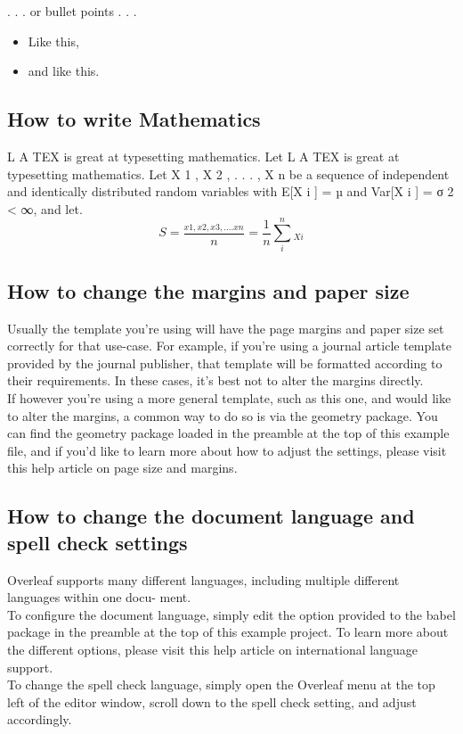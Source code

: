 \documentclass{article}
\begin{document}
\begin{flushleft}
\begin{enumerate}
			
		\end{enumerate}
				. . . or bullet points . . .
	 \begin{itemize}
		\item Like this,
		\item and like this.
	\end{itemize}
\subsection{How to write Mathematics}
L A TEX is great at typesetting mathematics. Let 
L A TEX is great at typesetting mathematics. Let X 1 , X 2 , . . . , X n be a sequence of independent and identically distributed random variables with E[X i ] = µ and Var[X i ] = σ 2 < ∞, and let.
\begin{equation}
S=\frac{_{x1,x2,x3,....xn}}{n}=\frac{1}{n}\sum_{i}^{n}_{Xi}

\end{equation}
\subsection{How to change the margins and paper size}
Usually the template you’re using will have the page margins and paper size set correctly for that
use-case. For example, if you’re using a journal article template provided by the journal publisher,
that template will be formatted according to their requirements. In these cases, it’s best not to alter
the margins directly.\\
If however you’re using a more general template, such as this one, and would like to alter the
margins, a common way to do so is via the geometry package. You can find the geometry package
loaded in the preamble at the top of this example file, and if you’d like to learn more about how to
adjust the settings, please visit this help article on page size and margins.
\subsection{How to change the document language and spell check settings}
Overleaf supports many different languages, including multiple different languages within one docu-
ment.\\
To configure the document language, simply edit the option provided to the babel package in the
preamble at the top of this example project. To learn more about the different options, please visit
this help article on international language support.\\
To change the spell check language, simply open the Overleaf menu at the top left of the editor
window, scroll down to the spell check setting, and adjust accordingly.

\end{flushleft}
\end{document}
